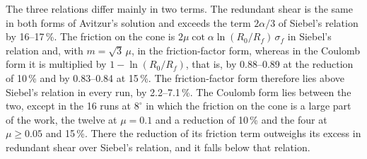 \documentclass[subscriptcorrection,upint,varvw,barcolor=Goldenrod3,mathalfa=cal=euler,balance,hyphenate,french,pdf-a]{asmejour} %
\begin{document}
The three relations differ mainly in two terms. The redundant shear is the same in both forms of
Avitzur's solution and exceeds the term $2\alpha/3$ of Siebel's relation by 16--17\,\%. The
friction on the cone is $2\mu\cot\alpha\ln(R_0/R_f)\,\sigma_f$ in Siebel's relation and, with
$m=\sqrt3\,\mu$, in the friction-factor form, whereas in the Coulomb form it is multiplied by
$1-\ln(R_0/R_f)$, that is, by 0.88--0.89 at the reduction of 10\,\% and by 0.83--0.84 at 15\,\%.
The friction-factor form therefore lies above Siebel's relation in every run, by 2.2--7.1\,\%.
The Coulomb form lies between the two, except in the 16 runs at $8^\circ$ in which the friction on
the cone is a large part of the work, the twelve at $\mu = 0.1$ and a reduction of 10\,\% and the
four at $\mu \ge 0.05$ and 15\,\%. There the reduction of its friction term outweighs its excess
in redundant shear over Siebel's relation, and it falls below that relation.
\end{document}

